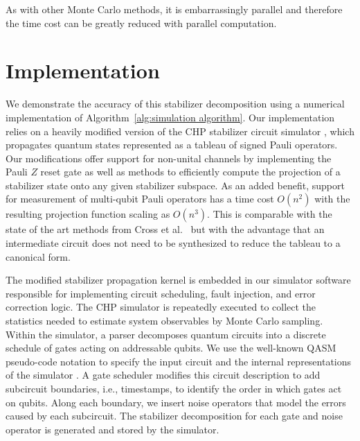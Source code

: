 \documentclass[twocolumn,pra]{revtex4}
\begin{document}
As with other Monte Carlo methods, it is embarrassingly parallel and therefore the time cost can be greatly reduced with parallel computation.
\section{Implementation} 
\label{sec:ex}
We demonstrate the accuracy of this stabilizer decomposition using a numerical implementation of Algorithm~\ref{alg:simulation algorithm}. Our implementation relies on a heavily modified version of the CHP stabilizer circuit simulator \cite{Aaronson2004}, which propagates quantum states represented as a tableau of signed Pauli operators. Our modifications offer support for non-unital channels by implementing the Pauli $Z$ reset gate as well as methods to efficiently compute the projection of a stabilizer state onto any given stabilizer subspace.
As an added benefit, support for measurement of multi-qubit Pauli operators has a time cost $O(n^2)$ with the resulting projection function scaling as $O(n^3)$. This is comparable with the state of the art methods from Cross et al.~\cite{Cross2014} but with the advantage that an intermediate circuit does not need to be synthesized to reduce the tableau to a canonical form.
\par
The modified stabilizer propagation kernel is embedded in our simulator software responsible for implementing circuit scheduling, fault injection, and error correction logic. The CHP simulator is repeatedly executed to collect the statistics needed to estimate system observables by Monte Carlo sampling. Within the simulator, a parser decomposes quantum circuits into a discrete schedule of gates acting on addressable qubits. We use the well-known QASM pseudo-code notation to specify the input circuit and the internal representations of the simulator \cite{Balensiefer2005}. A gate scheduler modifies this circuit description to add subcircuit boundaries, i.e., timestamps, to identify the order in which gates act on qubits. Along each boundary, we insert noise operators that model the errors caused by each subcircuit. The stabilizer decomposition for each gate and noise operator is generated and stored by the simulator.
\par
\end{document}
